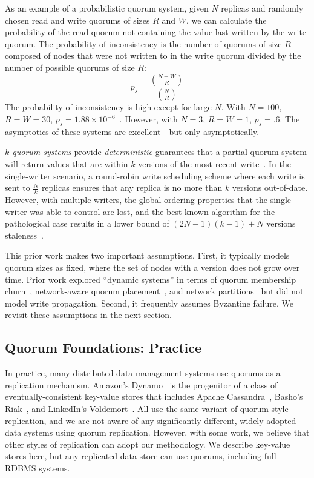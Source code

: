 \documentclass{vldb}
\newcommand{\subsectionskip}{-0em}
\begin{document}
As an example of a probabilistic quorum system, given $N$ replicas and
randomly chosen read and write quorums of sizes $R$ and $W$, we can
calculate the probability of the read quorum not containing the value
last written by the write quorum.  The probability of inconsistency is
the number of quorums of size $R$ composed of nodes that were not
written to in the write quorum divided by the number of possible
quorums of size $R$:
\begin{equation}
\label{eq:prob-strict}
p_{s}=\frac{{N-W \choose R}}{{N \choose R}}
\end{equation}
The probability of inconsistency is high except for large $N$.  With
$N=100$, $R=W=30$, $p_{s} = 1.88 \times
10^{-6}$~\cite{non-strict}.  However, with $N=3$, $R=W=1$, $p_{s}
= .\overline{6}$.  The asymptotics of these systems are
excellent---but only asymptotically.

\textit{$k$-quorum systems} provide \textit{deterministic} guarantees
that a partial quorum system will return values that are within $k$
versions of the most recent write~\cite{non-strict}.  In the
single-writer scenario, a round-robin write scheduling scheme where
each write is sent to $\frac{N}{k}$ replicas ensures that any replica
is no more than $k$ versions out-of-date.  However, with multiple
writers, the global ordering properties that the single-writer was
able to control are lost, and the best known algorithm for the
pathological case results in a lower bound of $(2N-1)(k-1)+N$ versions
staleness~\cite{multi-k-quorum}.

This prior work makes two important assumptions. First, it typically
models quorum sizes as fixed, where the set of nodes with a version
does not grow over time.  Prior work explored ``dynamic systems'' in
terms of quorum membership churn~\cite{prob-quorum-dynamic},
network-aware quorum placement~\cite{delay-quorum, quorum-placement},
and network partitions~\cite{partitionedquorum} but did not model
write propagation. Second, it frequently assumes Byzantine failure.
We revisit these assumptions in the next section.

\vspace{\subsectionskip}\subsection{Quorum Foundations: Practice}
\label{sec:practice}

In practice, many distributed data management systems use quorums as a
replication mechanism. Amazon's Dynamo~\cite{dynamo} is the progenitor
of a class of eventually-consistent key-value stores that includes
Apache Cassandra~\cite{cassandra, cassandra-sigmod}, Basho's
Riak~\cite{riak}, and LinkedIn's Voldemort~\cite{voldemort,
  voldemortpub}.  All use the same variant of quorum-style
replication, and we are not aware of any significantly different,
widely adopted data systems using quorum replication.  However, with
some work, we believe that other styles of replication can adopt our
methodology.  We describe key-value stores here, but any replicated
data store can use quorums, including full RDBMS systems.
\end{document}
